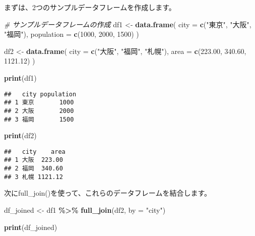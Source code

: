 \documentclass[
]{article}
\newenvironment{Shaded}{\begin{snugshade}}{\end{snugshade}}
\newcommand{\AttributeTok}[1]{\textcolor[rgb]{0.13,0.29,0.53}{#1}}
\newcommand{\CommentTok}[1]{\textcolor[rgb]{0.56,0.35,0.01}{\textit{#1}}}
\newcommand{\DecValTok}[1]{\textcolor[rgb]{0.00,0.00,0.81}{#1}}
\newcommand{\FloatTok}[1]{\textcolor[rgb]{0.00,0.00,0.81}{#1}}
\newcommand{\FunctionTok}[1]{\textcolor[rgb]{0.13,0.29,0.53}{\textbf{#1}}}
\newcommand{\NormalTok}[1]{#1}
\newcommand{\OtherTok}[1]{\textcolor[rgb]{0.56,0.35,0.01}{#1}}
\newcommand{\SpecialCharTok}[1]{\textcolor[rgb]{0.81,0.36,0.00}{\textbf{#1}}}
\newcommand{\StringTok}[1]{\textcolor[rgb]{0.31,0.60,0.02}{#1}}
\begin{document}
まずは、2つのサンプルデータフレームを作成します。

\begin{Shaded}
\begin{Highlighting}[]
\CommentTok{\# サンプルデータフレームの作成}
\NormalTok{df1 }\OtherTok{\textless{}{-}} \FunctionTok{data.frame}\NormalTok{(}
  \AttributeTok{city =} \FunctionTok{c}\NormalTok{(}\StringTok{"東京"}\NormalTok{, }\StringTok{"大阪"}\NormalTok{, }\StringTok{"福岡"}\NormalTok{),}
  \AttributeTok{population =} \FunctionTok{c}\NormalTok{(}\DecValTok{1000}\NormalTok{, }\DecValTok{2000}\NormalTok{, }\DecValTok{1500}\NormalTok{)}
\NormalTok{)}

\NormalTok{df2 }\OtherTok{\textless{}{-}} \FunctionTok{data.frame}\NormalTok{(}
  \AttributeTok{city =} \FunctionTok{c}\NormalTok{(}\StringTok{"大阪"}\NormalTok{, }\StringTok{"福岡"}\NormalTok{, }\StringTok{"札幌"}\NormalTok{),}
  \AttributeTok{area =} \FunctionTok{c}\NormalTok{(}\FloatTok{223.00}\NormalTok{, }\FloatTok{340.60}\NormalTok{, }\FloatTok{1121.12}\NormalTok{)}
\NormalTok{)}
\end{Highlighting}
\end{Shaded}

\begin{Shaded}
\begin{Highlighting}[]
\FunctionTok{print}\NormalTok{(df1)}
\end{Highlighting}
\end{Shaded}

\begin{verbatim}
##   city population
## 1 東京       1000
## 2 大阪       2000
## 3 福岡       1500
\end{verbatim}

\begin{Shaded}
\begin{Highlighting}[]
\FunctionTok{print}\NormalTok{(df2)}
\end{Highlighting}
\end{Shaded}

\begin{verbatim}
##   city    area
## 1 大阪  223.00
## 2 福岡  340.60
## 3 札幌 1121.12
\end{verbatim}

次にfull\_join()を使って、これらのデータフレームを結合します。

\begin{Shaded}
\begin{Highlighting}[]
\NormalTok{df\_joined }\OtherTok{\textless{}{-}}\NormalTok{ df1 }\SpecialCharTok{\%\textgreater{}\%}
  \FunctionTok{full\_join}\NormalTok{(df2, }\AttributeTok{by =} \StringTok{"city"}\NormalTok{)}

\FunctionTok{print}\NormalTok{(df\_joined)}
\end{Highlighting}
\end{Shaded}
\end{document}
